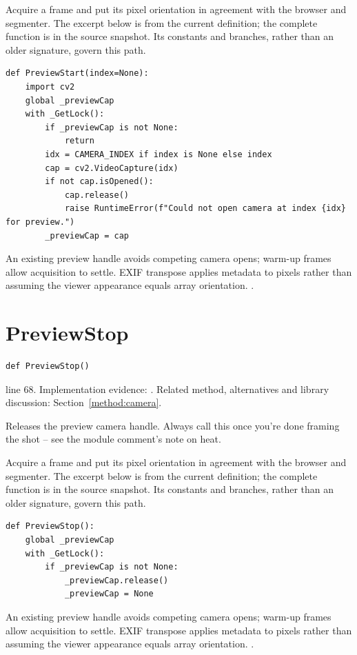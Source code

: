 Acquire a frame and put its pixel orientation in agreement with the browser and segmenter. The excerpt below is from the current definition; the complete function is in the source snapshot. Its constants and branches, rather than an older signature, govern this path.


\begin{lstlisting}[style=plain]
def PreviewStart(index=None):
    import cv2
    global _previewCap
    with _GetLock():
        if _previewCap is not None:
            return
        idx = CAMERA_INDEX if index is None else index
        cap = cv2.VideoCapture(idx)
        if not cap.isOpened():
            cap.release()
            raise RuntimeError(f"Could not open camera at index {idx} for preview.")
        _previewCap = cap
\end{lstlisting}
An existing preview handle avoids competing camera opens; warm-up frames allow acquisition to settle. EXIF transpose applies metadata to pixels rather than assuming the viewer appearance equals array orientation. \cite{opencvcamera,pillowops}.


\section{PreviewStop}\label{fn:web-camera:PreviewStop}
\begin{lstlisting}[style=sig]
def PreviewStop()
\end{lstlisting}
 line 68. Implementation evidence: \cite{code2026}. Related method, alternatives and library discussion: Section~\ref{method:camera}.


Releases the preview camera handle. Always call this once you're done framing the shot -- see the module comment's note on heat.


Acquire a frame and put its pixel orientation in agreement with the browser and segmenter. The excerpt below is from the current definition; the complete function is in the source snapshot. Its constants and branches, rather than an older signature, govern this path.


\begin{lstlisting}[style=plain]
def PreviewStop():
    global _previewCap
    with _GetLock():
        if _previewCap is not None:
            _previewCap.release()
            _previewCap = None
\end{lstlisting}
An existing preview handle avoids competing camera opens; warm-up frames allow acquisition to settle. EXIF transpose applies metadata to pixels rather than assuming the viewer appearance equals array orientation. \cite{opencvcamera,pillowops}.


